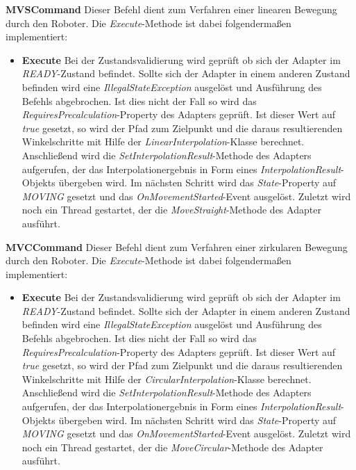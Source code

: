 \textbf{MVSCommand}
\newline
Dieser Befehl dient zum Verfahren einer linearen Bewegung durch den Roboter. Die \textit{Execute}-Methode ist dabei folgendermaßen implementiert:
\begin{itemize}
\item \textbf{Execute}
\newline
Bei der Zustandsvalidierung wird geprüft ob sich der Adapter im \textit{READY}-Zustand befindet. Sollte sich der Adapter in einem anderen Zustand befinden wird eine \textit{IllegalStateException} ausgelöst und Ausführung des Befehls abgebrochen. Ist dies nicht der Fall so wird das \textit{RequiresPrecalculation}-Property des Adapters geprüft. Ist dieser Wert auf \textit{true} gesetzt, so wird der Pfad zum Zielpunkt und die daraus resultierenden Winkelschritte mit Hilfe der \textit{LinearInterpolation}-Klasse berechnet. Anschließend wird die \textit{SetInterpolationResult}-Methode des Adapters aufgerufen, der das Interpolationergebnis in Form eines \textit{InterpolationResult}-Objekts übergeben wird. Im nächsten Schritt wird das \textit{State}-Property auf \textit{MOVING} gesetzt und das \textit{OnMovementStarted}-Event ausgelöst. Zuletzt wird noch ein Thread gestartet, der die \textit{MoveStraight}-Methode des Adapter ausführt.
\end{itemize}

\textbf{MVCCommand}
\newline
Dieser Befehl dient zum Verfahren einer zirkularen Bewegung durch den Roboter. Die \textit{Execute}-Methode ist dabei folgendermaßen implementiert:
\begin{itemize}
\item \textbf{Execute}
\newline
Bei der Zustandsvalidierung wird geprüft ob sich der Adapter im \textit{READY}-Zustand befindet. Sollte sich der Adapter in einem anderen Zustand befinden wird eine \textit{IllegalStateException} ausgelöst und Ausführung des Befehls abgebrochen. Ist dies nicht der Fall so wird das \textit{RequiresPrecalculation}-Property des Adapters geprüft. Ist dieser Wert auf \textit{true} gesetzt, so wird der Pfad zum Zielpunkt und die daraus resultierenden Winkelschritte mit Hilfe der  \textit{CircularInterpolation}-Klasse berechnet. Anschließend wird die \textit{SetInterpolationResult}-Methode des Adapters aufgerufen, der das Interpolationergebnis in Form eines \textit{InterpolationResult}-Objekts übergeben wird. Im nächsten Schritt wird das \textit{State}-Property auf \textit{MOVING} gesetzt und das \textit{OnMovementStarted}-Event ausgelöst. Zuletzt wird noch ein Thread gestartet, der die \textit{MoveCircular}-Methode des Adapter ausführt.
\end{itemize}


